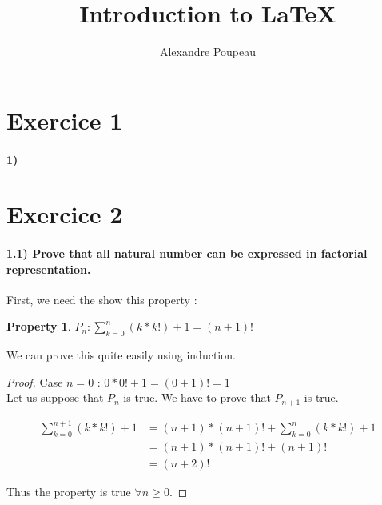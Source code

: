 \documentclass{article}
\newtheorem{prop}{Property}
\begin{document}
\title{Introduction to \LaTeX{}}
\author{Alexandre Poupeau}

\maketitle


\section*{Exercice 1}

\paragraph{1)}

\cite{author1}

\section*{Exercice 2}

\paragraph{1.1) Prove that all natural number can be expressed in factorial representation.}

First, we need the show this property :

\begin{prop}
  \label{prop1}
  $P_n : \displaystyle\sum_{k=0}^n (k*k!) +1 = (n+1)!$
\end{prop}

We can prove this quite easily using induction.

\begin{proof}

  Case $n=0$ : $0*0! + 1 = (0+1)! = 1$\\

  Let us suppose that $P_n$ is true. We have to prove that $P_{n+1}$ is true.

  \begin{equation*}
    \begin{split}
      \displaystyle\sum_{k=0}^{n+1} (k*k!) +1 & = (n+1)*(n+1)! + \displaystyle\sum_{k=0}^n (k*k!) +1 \\
       & = (n+1)*(n+1)! + (n+1)! \\
       & = (n+2)!
    \end{split}
  \end{equation*}

  Thus the property is true $\forall n \geq  0$.
\end{proof}
\end{document}
